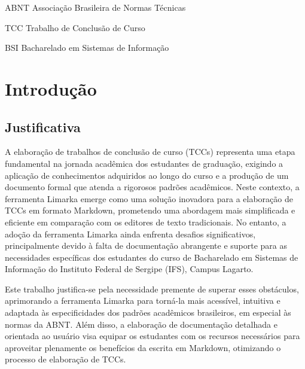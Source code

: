 \documentclass[
	12pt,				%
	oneside,			%
	a4paper,			%
	english,			%
	french,				%
	spanish,			%
	brazil				%
	]{abntex2}
\newcommand{\listasdousuario}{}
\begin{document}
\listasdousuario

\begin{siglas}
  \item[ABNT] Associação Brasileira de Normas Técnicas
  \item[TCC] Trabalho de Conclusão de Curso
  \item[BSI] Bacharelado em Sistemas de Informação
\end{siglas}

\tableofcontents*
\cleardoublepage


\textual
\pagestyle{simple}                  %


\hypertarget{introduuxe7uxe3o}{%
\chapter{Introdução}\label{introduuxe7uxe3o}}

\hypertarget{justificativa}{%
\section{Justificativa}\label{justificativa}}

A elaboração de trabalhos de conclusão de curso (TCCs) representa uma
etapa fundamental na jornada acadêmica dos estudantes de graduação,
exigindo a aplicação de conhecimentos adquiridos ao longo do curso e a
produção de um documento formal que atenda a rigorosos padrões
acadêmicos. Neste contexto, a ferramenta Limarka emerge como uma solução
inovadora para a elaboração de TCCs em formato Markdown, prometendo uma
abordagem mais simplificada e eficiente em comparação com os editores de
texto tradicionais. No entanto, a adoção da ferramenta Limarka ainda
enfrenta desafios significativos, principalmente devido à falta de
documentação abrangente e suporte para as necessidades específicas dos
estudantes do curso de Bacharelado em Sistemas de Informação do
Instituto Federal de Sergipe (IFS), Campus Lagarto.

Este trabalho justifica-se pela necessidade premente de superar esses
obstáculos, aprimorando a ferramenta Limarka para torná-la mais
acessível, intuitiva e adaptada às especificidades dos padrões
acadêmicos brasileiros, em especial às normas da ABNT. Além disso, a
elaboração de documentação detalhada e orientada ao usuário visa equipar
os estudantes com os recursos necessários para aproveitar plenamente os
benefícios da escrita em Markdown, otimizando o processo de elaboração
de TCCs.
\end{document}
